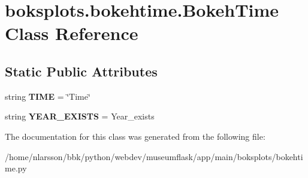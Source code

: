 \hypertarget{classboksplots_1_1bokehtime_1_1BokehTime}{}\section{boksplots.\+bokehtime.\+Bokeh\+Time Class Reference}
\label{classboksplots_1_1bokehtime_1_1BokehTime}
\subsection*{Static Public Attributes}
\begin{DoxyCompactItemize}
\item 
\mbox{\label{classboksplots_1_1bokehtime_1_1BokehTime_ad7ebab3e207b41ac020e29d197c5da2c}} 
string {\bfseries T\+I\+ME} = \char`\"{}Time\char`\"{}
\item 
\mbox{\label{classboksplots_1_1bokehtime_1_1BokehTime_ab6c8519c323434737faab9d31c824673}} 
string {\bfseries Y\+E\+A\+R\+\_\+\+E\+X\+I\+S\+TS} = \textquotesingle{}Year\+\_\+exists\textquotesingle{}
\end{DoxyCompactItemize}


The documentation for this class was generated from the following file\+:\begin{DoxyCompactItemize}
\item 
/home/nlarsson/bbk/python/webdev/museumflask/app/main/boksplots/bokehtime.\+py\end{DoxyCompactItemize}
